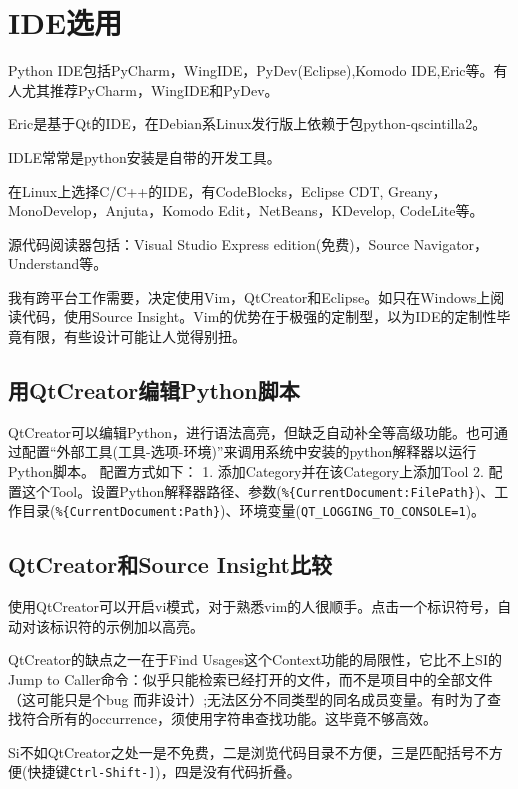 
\section{IDE选用}



Python IDE包括PyCharm，WingIDE，PyDev(Eclipse),Komodo IDE,Eric等。有人尤其推荐PyCharm，WingIDE和PyDev。

Eric是基于Qt的IDE，在Debian系Linux发行版上依赖于包python-qscintilla2。

IDLE常常是python安装是自带的开发工具。

在Linux上选择C/C++的IDE，有CodeBlocks，Eclipse CDT, Greany，MonoDevelop，Anjuta，Komodo Edit，NetBeans，KDevelop, CodeLite等。

源代码阅读器包括：Visual Studio Express edition(免费)，Source Navigator，Understand等。

我有跨平台工作需要，决定使用Vim，QtCreator和Eclipse。如只在Windows上阅读代码，使用Source Insight。Vim的优势在于极强的定制型，以为IDE的定制性毕竟有限，有些设计可能让人觉得别扭。


\subsection{用QtCreator编辑Python脚本}
QtCreator可以编辑Python，进行语法高亮，但缺乏自动补全等高级功能。也可通过配置“外部工具(工具-选项-环境)”来调用系统中安装的python解释器以运行Python脚本。
配置方式如下：
1. 添加Category并在该Category上添加Tool
2. 配置这个Tool。设置Python解释器路径、参数(\verb|%{CurrentDocument:FilePath}|)、工作目录(\verb|%{CurrentDocument:Path}|)、环境变量(\verb|QT_LOGGING_TO_CONSOLE=1|)。

\subsection{QtCreator和Source Insight比较}
使用QtCreator可以开启vi模式，对于熟悉vim的人很顺手。点击一个标识符号，自动对该标识符的示例加以高亮。

QtCreator的缺点之一在于Find Usages这个Context功能的局限性，它比不上SI的Jump to Caller命令：似乎只能检索已经打开的文件，而不是项目中的全部文件（这可能只是个bug 而非设计）;无法区分不同类型的同名成员变量。有时为了查找符合所有的occurrence，须使用字符串查找功能。这毕竟不够高效。


Si不如QtCreator之处一是不免费，二是浏览代码目录不方便，三是匹配括号不方便(快捷键\verb$Ctrl-Shift-]$)，四是没有代码折叠。


